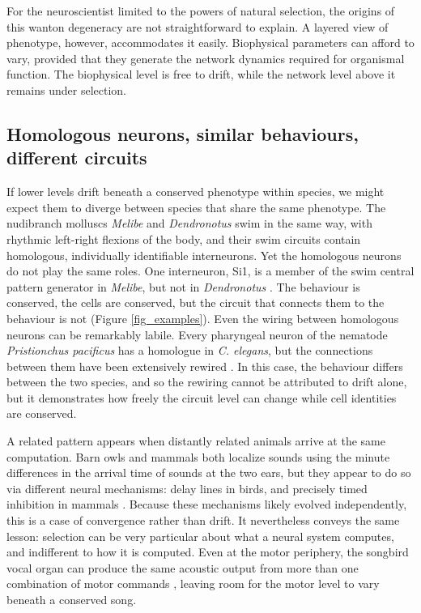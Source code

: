 \documentclass[twocolumn]{article}
\begin{document}
For the neuroscientist limited to the powers of natural selection, the origins of this wanton degeneracy are not straightforward to explain. A layered view of phenotype, however, accommodates it easily. Biophysical parameters can afford to vary, provided that they generate the network dynamics required for organismal function. The biophysical level is free to drift, while the network level above it remains under selection.

\subsection{Homologous neurons, similar behaviours, different circuits}

If lower levels drift beneath a conserved phenotype within species, we might expect them to diverge between species that share the same phenotype. The nudibranch molluscs \textit{Melibe} and \textit{Dendronotus} swim in the same way, with rhythmic left-right flexions of the body, and their swim circuits contain homologous, individually identifiable interneurons. Yet the homologous neurons do not play the same roles. One interneuron, Si1, is a member of the swim central pattern generator in \textit{Melibe}, but not in \textit{Dendronotus} \cite{Sakurai_Newcomb_2011}. The behaviour is conserved, the cells are conserved, but the circuit that connects them to the behaviour is not (Figure \ref{fig_examples}). Even the wiring between homologous neurons can be remarkably labile. Every pharyngeal neuron of the nematode \textit{Pristionchus pacificus} has a homologue in \textit{C. elegans}, but the connections between them have been extensively rewired \cite{Bumbarger_Riebesell_2013}. In this case, the behaviour differs between the two species, and so the rewiring cannot be attributed to drift alone, but it demonstrates how freely the circuit level can change while cell identities are conserved.

A related pattern appears when distantly related animals arrive at the same computation. Barn owls and mammals both localize sounds using the minute differences in the arrival time of sounds at the two ears, but they appear to do so via different neural mechanisms: delay lines in birds, and precisely timed inhibition in mammals \cite{Grothe_2003, McAlpine_Grothe_2003}. Because these mechanisms likely evolved independently, this is a case of convergence rather than drift. It nevertheless conveys the same lesson: selection can be very particular about what a neural system computes, and indifferent to how it is computed. Even at the motor periphery, the songbird vocal organ can produce the same acoustic output from more than one combination of motor commands \cite{Elemans_Rasmussen_2015}, leaving room for the motor level to vary beneath a conserved song.
\end{document}
